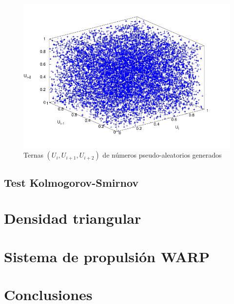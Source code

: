 \documentclass{sig-alternate}
\begin{document}
\begin{figure}[hp]
\centering
\includegraphics[scale=0.8]{graficos/ternas}
\caption{Ternas $(U_{i}, U_{i+1}, U_{i+2})$ de n\'{u}meros pseudo-aleatorios
generados}
\label{fig:ternas}
\end{figure}

\subsection{Test Kolmogorov-Smirnov}\label{testks}

\section{Densidad triangular}\label{triangular}

\section{Sistema de propulsi\'{o}n WARP}\label{simulacionpropulsor}

\section{Conclusiones}\label{conclusiones}
\end{document}
